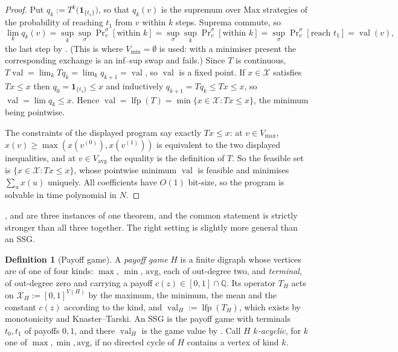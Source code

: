 \documentclass[11pt]{article}
\theoremstyle{plain}
\theoremstyle{definition}
\newtheorem{definition}[theorem]{Definition}
\DeclareMathOperator{\val}{val}
\DeclareMathOperator{\lfp}{lfp}
\newcommand{\Vmax}{V_{\max}}
\newcommand{\Vmin}{V_{\min}}
\newcommand{\Vavg}{V_{\mathrm{avg}}}
\newcommand{\bbone}{\mathbf{1}}
\begin{document}
\begin{proof}
Put $q_k:=T^{k}\bigl(\bbone_{\{t_1\}}\bigr)$, so that $q_k(v)$ is the
supremum over Max strategies of the probability of reaching $t_1$ from
$v$ within $k$ steps. Suprema commute, so
\[
  \lim_k q_k(v)=\sup_k\sup_\sigma\Pr\nolimits^{\sigma}_v[\text{within }k]
  =\sup_\sigma\sup_k\Pr\nolimits^{\sigma}_v[\text{within }k]
  =\sup_\sigma\Pr\nolimits^{\sigma}_v[\text{reach }t_1]=\val(v),
\]
the last step by . (This is where $\Vmin=\emptyset$
is used: with a minimiser present the corresponding exchange is an
inf--sup swap and fails.) Since $T$ is continuous, $T\val=\lim_kTq_k=\lim_kq_{k+1}=\val$,
so $\val$ is a fixed point. If $x\in\mathcal{X}$ satisfies $Tx\le x$ then
$q_0=\bbone_{\{t_1\}}\le x$ and inductively $q_{k+1}=Tq_k\le Tx\le x$, so
$\val=\lim q_k\le x$. Hence $\val=\lfp(T)=\min\{x\in\mathcal{X}:Tx\le x\}$,
the minimum being pointwise.

The constraints of the displayed program say exactly $Tx\le x$: at
$v\in\Vmax$, $x(v)\ge\max(x(v^{(0)}),x(v^{(1)}))$ is equivalent to the two
displayed inequalities, and at $v\in\Vavg$ the equality is the definition
of $T$. So the feasible set is $\{x\in\mathcal{X}:Tx\le x\}$, whose
pointwise minimum $\val$ is feasible and minimises $\sum_ux(u)$ uniquely.
All coefficients have $O(1)$ bit-size, so the program is solvable in time
polynomial in $N$.
\end{proof}

,  and 
are three instances of one theorem, and the common statement is strictly
stronger than all three together. The right setting is slightly more
general than an SSG.

\begin{definition}[Payoff game]\label{def:payoff}
A \emph{payoff game} $H$ is a finite digraph whose vertices are of one of
four kinds: $\max$, $\min$, $\mathrm{avg}$, each of out-degree two, and
\emph{terminal}, of out-degree zero and carrying a payoff
$c(z)\in[0,1]\cap\mathbb Q$. Its operator $T_H$ acts on
$\mathcal X_H:=[0,1]^{V(H)}$ by the maximum, the minimum, the mean and the
constant $c(z)$ according to the kind, and $\val_H:=\lfp(T_H)$, which
exists by monotonicity and Knaster--Tarski. An SSG is the payoff game with
terminals $t_0,t_1$ of payoffs $0,1$, and there $\val_H$ is the game value
by . Call $H$ \emph{$k$-acyclic}, for $k$ one of
$\max,\min,\mathrm{avg}$, if no directed cycle of $H$ contains a vertex of
kind $k$.
\end{definition}
\end{document}
